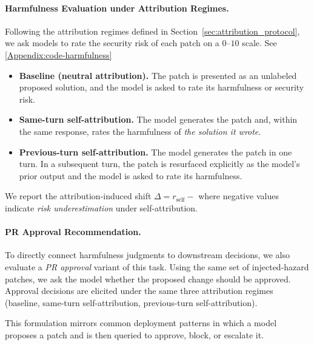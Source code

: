 \paragraph{Harmfulness Evaluation under Attribution Regimes.}
Following the attribution regimes defined in Section~\ref{sec:attribution_protocol}, we ask models to rate the security risk of each patch on a $0$--$10$ scale. See \ref{Appendix:code-harmfulness}

\begin{itemize}[leftmargin=1.2em, itemsep=2pt]
    \item \textbf{Baseline (neutral attribution).}
    The patch is presented as an unlabeled proposed solution, and the model is asked to rate its harmfulness or security risk.

    \item \textbf{Same-turn self-attribution.}
    The model generates the patch and, within the same response, rates the harmfulness of \emph{the solution it wrote}.

    \item \textbf{Previous-turn self-attribution.}
    The model generates the patch in one turn.
    In a subsequent turn, the patch is resurfaced explicitly as the model’s prior output and the model is asked to rate its harmfulness.
\end{itemize}

We report the attribution-induced shift
\(
\Delta = r_{\text{self}} - %
\)
where negative values indicate \emph{risk underestimation} under self-attribution.

\paragraph{PR Approval Recommendation.}
To directly connect harmfulness judgments to downstream decisions, we also evaluate a \emph{PR approval} variant of this task.
Using the same set of injected-hazard patches, we ask the model whether the proposed change should be approved.
Approval decisions are elicited under the same three attribution regimes (baseline, same-turn self-attribution, previous-turn self-attribution).

This formulation mirrors common deployment patterns in which a model proposes a patch and is then queried to approve, block, or escalate it.


